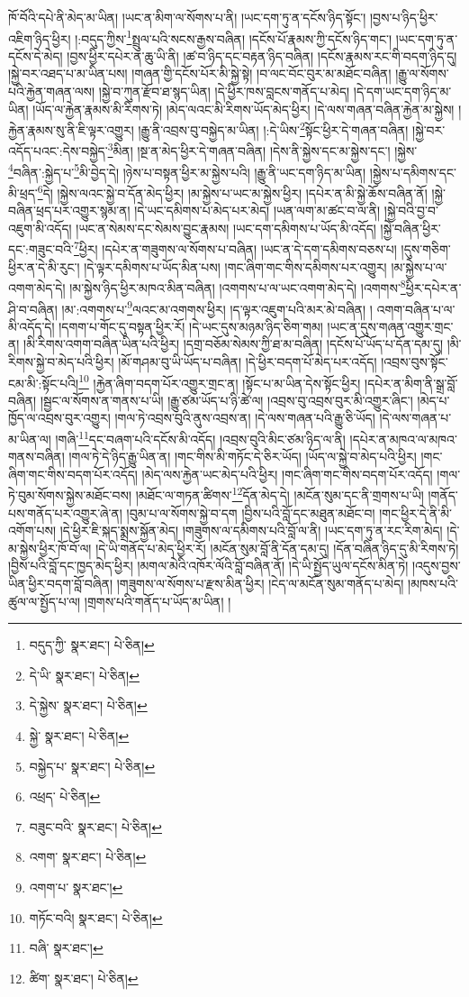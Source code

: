 ཁོ་བོའི་དཔེ་ནི་མེད་མ་ཡིན། །ཡང་ན་མིག་ལ་སོགས་པ་ནི། །ཡང་དག་ཏུ་ན་དངོས་ཉིད་སྟོང་། །བྱས་པ་ཉིད་ཕྱིར་འཇིག་ཉིད་ཕྱིར། །:བདུད་ཀྱིས་\footnote{བདུད་ཀྱི་  སྣར་ཐང་།  པེ་ཅིན། }སྤྲུལ་པའི་སངས་རྒྱས་བཞིན། །དངོས་པོ་རྣམས་ཀྱི་དངོས་ཉིད་གང་། །ཡང་དག་ཏུ་ན་དངོས་དེ་མེད། །བྱས་ཕྱིར་དཔེར་ན་ཆུ་ཡི་ནི། །ཚ་བ་ཉིད་དང་བརྟན་ཉིད་བཞིན། །དངོས་རྣམས་རང་གི་བདག་ཉིད་དུ། །སྐྱེ་བར་འཐད་པ་མ་ཡིན་པས། །གཞན་གྱི་དངོས་པོར་མི་སྐྱེ་སྟེ། །བ་ལང་བོང་བུར་མ་མཐོང་བཞིན། །རྒྱུ་ལ་སོགས་པའི་རྐྱེན་གཞན་ལས། །སྐྱེ་བ་ཀུན་རྫོབ་ཐ་སྙད་ཡིན། །དེ་ཕྱིར་ཁས་བླངས་གནོད་པ་མེད། །དེ་དག་ཡང་དག་ཉིད་མ་ཡིན། །ཡོད་ལ་རྐྱེན་རྣམས་མི་རིགས་ཏེ། །མེད་ལའང་མི་རིགས་ཡོད་མེད་ཕྱིར། །དེ་ལས་གཞན་བཞིན་རྐྱེན་མ་སྐྱེས། །རྐྱེན་རྣམས་སུ་ནི་ཇི་ལྟར་འགྱུར། །རྒྱུ་ནི་འབྲས་བུ་བསྐྱེད་མ་ཡིན། །:དེ་ཡིས་\footnote{དེ་ཡི་  སྣར་ཐང་།  པེ་ཅིན། }སྟོང་ཕྱིར་དེ་གཞན་བཞིན། །སྐྱེ་བར་འདོད་པའང་:དེས་བསྐྱེད་\footnote{དེ་སྐྱེས་  སྣར་ཐང་།  པེ་ཅིན། }མིན། །སྔ་ན་མེད་ཕྱིར་དེ་གཞན་བཞིན། །དེས་ནི་སྐྱེས་དང་མ་སྐྱེས་དང་། །སྐྱེས་\footnote{སྐྱེ་  སྣར་ཐང་།  པེ་ཅིན། }བཞིན་:སྐྱེད་པ་\footnote{བསྐྱེད་པ་  སྣར་ཐང་།  པེ་ཅིན། }མི་བྱེད་དེ། །ཉེས་པ་བསྟན་ཕྱིར་མ་སྐྱེས་པའི། །རྒྱུ་ནི་ཡང་དག་ཉིད་མ་ཡིན། །སྐྱེས་པ་དམིགས་དང་མི་ཕྲད་\footnote{འཕྲད་  པེ་ཅིན། }དེ། །སྐྱེས་ལའང་སྐྱེ་བ་དོན་མེད་ཕྱིར། །མ་སྐྱེས་པ་ཡང་མ་སྐྱེས་ཕྱིར། །དཔེར་ན་མི་སྐྱེ་ཆོས་བཞིན་ནོ། །སྐྱེ་བཞིན་ཕྲད་པར་འགྱུར་སྙམ་ན། །དེ་ཡང་དམིགས་པ་མེད་པར་མེད། །ཡན་ལག་མ་ཚང་བ་ལ་ནི། །སྐྱེ་བའི་བྱ་བ་འཇུག་མི་འདོད། །ཡང་ན་སེམས་དང་སེམས་བྱུང་རྣམས། །ཡང་དག་དམིགས་པ་ཡོད་མི་འདོད། །སྐྱེ་བཞིན་ཕྱིར་དང་:གཟུང་བའི་\footnote{བཟུང་བའི་  སྣར་ཐང་།  པེ་ཅིན། }ཕྱིར། །དཔེར་ན་གཟུགས་ལ་སོགས་པ་བཞིན། །ཡང་ན་དེ་དག་དམིགས་བཅས་པ། །དུས་གཅིག་ཕྱིར་ན་དེ་མི་རུང་། །དེ་ལྟར་དམིགས་པ་ཡོད་མིན་པས། །གང་ཞིག་གང་གིས་དམིགས་པར་འགྱུར། །མ་སྐྱེས་པ་ལ་འགག་མེད་དེ། །མ་སྐྱེས་ཉིད་ཕྱིར་མཁའ་མིན་བཞིན། །འགགས་པ་ལ་ཡང་འགག་མེད་དེ། །འགགས་\footnote{འགག་  སྣར་ཐང་།  པེ་ཅིན། }ཕྱིར་དཔེར་ན་ཤི་བ་བཞིན། །མ་:འགགས་པ་\footnote{འགག་པ་  སྣར་ཐང་། }ལའང་མ་འགགས་ཕྱིར། །ད་ལྟར་འཇུག་པའི་མར་མེ་བཞིན། །
འགག་བཞིན་པ་ལ་མི་འདོད་དེ། །དགག་པ་གོང་དུ་བསྟན་ཕྱིར་རོ། །དེ་ཡང་དུས་མཉམ་ཉིད་ཅིག་གམ། །ཡང་ན་དུས་གཞན་འགྱུར་གྲང་ན། །མི་རིགས་འགག་བཞིན་ཡིན་པའི་ཕྱིར། །དགྲ་བཅོམ་སེམས་ཀྱི་ཐ་མ་བཞིན། །དངོས་པོ་ཡོད་པ་དོན་དམ་དུ། །མི་རིགས་སྐྱེ་བ་མེད་པའི་ཕྱིར། །མོ་གཤམ་བུ་ཡི་ཡོད་པ་བཞིན། །དེ་ཕྱིར་བདག་པོ་མེད་པར་འདོད། །འབྲས་བུས་སྟོང་ངམ་མི་:སྟོང་པའི།\footnote{གཏོང་བའི།  སྣར་ཐང་།  པེ་ཅིན། } །རྐྱེན་ཞིག་བདག་པོར་འགྱུར་གྲང་ན། །སྟོང་པ་མ་ཡིན་དེས་སྟོང་ཕྱིར། །དཔེར་ན་མིག་ནི་སྒྲ་བློ་བཞིན། །སྦྱང་ལ་སོགས་ན་གནས་པ་ཡི། །རྒྱུ་ཙམ་ཡོད་པ་ཉི་ཚེ་ལ། །འབྲས་བུ་འབྲས་བུར་མི་འགྱུར་ཞིང་། །མེད་པ་ཁྱོད་ལ་འབྲས་བུར་འགྱུར། །གལ་ཏེ་འབྲས་བུའི་ནུས་འབྲས་ན། །དེ་ལས་གཞན་པའི་རྒྱུ་ཅི་ཡོད། །དེ་ལས་གཞན་པ་མ་ཡིན་ལ། །གཞི་\footnote{བཞི་  སྣར་ཐང་། }དང་བཞག་པའི་དངོས་མི་འདོད། །འབྲས་བུའི་མིང་ཙམ་ཉིད་ལ་ནི། །དཔེར་ན་མཁའ་ལ་མཁའ་གནས་བཞིན། །གལ་ཏེ་དེ་ཉིད་རྒྱུ་ཡིན་ན། །གང་གིས་མི་གཏོང་དེ་ཅིར་ཡོད། །ཡོད་ལ་སྐྱེ་བ་མེད་པའི་ཕྱིར། །གང་ཞིག་གང་གིས་བདག་པོར་འདོད། །མེད་ལས་རྐྱེན་ཡང་མེད་པའི་ཕྱིར། །གང་ཞིག་གང་གིས་བདག་པོར་འདོད། །གལ་ཏེ་བུམ་སོགས་སྐྱེས་མཐོང་བས། །མཐོང་ལ་གཏན་ཚིགས་\footnote{ཚིག་  སྣར་ཐང་།  པེ་ཅིན། }དོན་མེད་དེ། །མངོན་སུམ་དང་ནི་གྲགས་པ་ཡི། །གནོད་པས་གནོད་པར་འགྱུར་ཞེ་ན། །བུམ་པ་ལ་སོགས་སྐྱེ་བ་དག །བྱིས་པའི་བློ་དང་མཐུན་མཐོང་བ། །གང་ཕྱིར་དེ་ནི་མི་འགོག་པས། །དེ་ཕྱིར་ཇི་སྐད་སྨྲས་སྐྱོན་མེད། །གཟུགས་ལ་དམིགས་པའི་བློ་ལ་ནི། །ཡང་དག་ཏུ་ན་རང་རིག་མེད། །དེ་མ་སྐྱེས་ཕྱིར་ཁོ་བོ་ལ། །དེ་ཡི་གནོད་པ་མེད་ཕྱིར་རོ། །མངོན་སུམ་བློ་ནི་དོན་དམ་དུ། །དོན་བཞིན་ཉིད་དུ་མི་རིགས་ཏེ། །བྱིས་པའི་བློ་དང་ཁྱད་མེད་ཕྱིར། །མགལ་མེའི་འཁོར་ལོའི་བློ་བཞིན་ནོ། །དེ་ཡི་སྤྱོད་ཡུལ་དངོས་མིན་ཏེ། །འདུས་བྱས་ཡིན་ཕྱིར་བདག་བློ་བཞིན། །གཟུགས་ལ་སོགས་པ་རྫས་མིན་ཕྱིར། །ངེད་ལ་མངོན་སུམ་གནོད་པ་མེད། །མཁས་པའི་ཚུལ་ལ་སྤྱོད་པ་ལ། །གྲགས་པའི་གནོད་པ་ཡོད་མ་ཡིན། །
